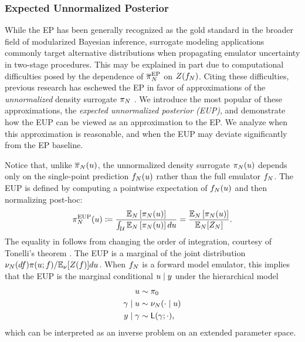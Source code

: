 \documentclass[12pt]{article}
\begin{document}
\subsubsection{Expected Unnormalized Posterior}
 While the EP has been generally recognized as the gold standard 
 in the broader field of modularized Bayesian inference, surrogate 
 modeling applications commonly target alternative distributions when 
 propagating emulator uncertainty in two-stage procedures. This may 
 be explained in part due to computational difficulties posed by 
 the dependence of $\overline{\pi}_{N}^{\mathrm{EP}}$ on $Z(f_{N})$.
Citing these difficulties, previous research has 
eschewed the EP in favor of approximations of the \textit{unnormalized}
density surrogate $\pi_{N}$ \citep{StuartTeck1,StuartTeck2,VehtariParallelGP}.
We introduce the most popular of these approximations, the 
\textit{expected unnormalized posterior (EUP)}, and demonstrate 
how the EUP can be viewed as an approximation to the EP. We analyze when 
this approximation is reasonable, and when the EUP may deviate significantly 
from the EP baseline.

Notice that, unlike $\overline{\pi}_{N}(u)$, the unnormalized density surrogate
$\pi_{N}(u)$ depends only on the single-point prediction $f_{N}(u)$
rather than the full emulator $f_{N}$. The EUP is defined by computing
a pointwise expectation of $f_{N}(u)$ and then normalizing post-hoc:
\begin{equation}
\pi_{N}^{\mathrm{EUP}}(u) \coloneqq 
\frac{\mathbb{E}_{N}\left[\pi_{N}(u) \right]}{\int_{\mathcal{U}} \mathbb{E}_{N}\left[\pi_{N}(u) \right] du}
= \frac{\mathbb{E}_{N}\left[\pi_{N}(u) \right]}{\mathbb{E}_{N}[Z_{N}]}. \label{eq:post-approx-EL} 
\end{equation}
The equality in  follows from
changing the order of integration, courtesy of Tonelli's theorem \citep{StuartTeck1}. The EUP
is a marginal of the joint distribution 
$\nu_{N}(df) \pi(u; f) / \mathbb{E}_{\nu_{}}[Z(f)] du$. 
When $f_{N}$ is a forward model emulator, this implies that the EUP is the 
marginal conditional $u \mid y$ under the hierarchical model 
\begin{align}
u &\sim \pi_0 \label{eq:el-prob-model} \\
\gamma \mid u &\sim \nu_{N}(\cdot \mid u) \nonumber \\
y \mid \gamma &\sim \mathsf{L}(\gamma; \cdot), \nonumber
\end{align}
which can be interpreted as an inverse problem on an extended parameter space.
\end{document}

